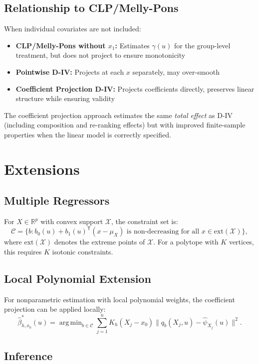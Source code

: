 \documentclass[12pt]{article}
\newcommand{\T}{\mathsf{T}}
\DeclareMathOperator*{\argmin}{arg\,min}
\newcommand{\R}{\mathbb{R}}
\begin{document}
\subsection{Relationship to CLP/Melly-Pons}

When individual covariates are not included:
\begin{itemize}
\item \textbf{CLP/Melly-Pons without $x_1$:} Estimates $\gamma(u)$ for the group-level treatment, but does not project to ensure monotonicity
\item \textbf{Pointwise D-IV:} Projects at each $x$ separately, may over-smooth
\item \textbf{Coefficient Projection D-IV:} Projects coefficients directly, preserves linear structure while ensuring validity
\end{itemize}

The coefficient projection approach estimates the same \emph{total effect} as D-IV (including composition and re-ranking effects) but with improved finite-sample properties when the linear model is correctly specified.

\section{Extensions}

\subsection{Multiple Regressors}

For $X \in \R^p$ with convex support $\mathcal{X}$, the constraint set is:
\[
\mathcal{C} = \{b : b_0(u) + b_1(u)^\T(x - \mu_X) \text{ is non-decreasing for all } x \in \text{ext}(\mathcal{X})\},
\]
where $\text{ext}(\mathcal{X})$ denotes the extreme points of $\mathcal{X}$. For a polytope with $K$ vertices, this requires $K$ isotonic constraints.

\subsection{Local Polynomial Extension}

For nonparametric estimation with local polynomial weights, the coefficient projection can be applied locally:
\[
\hat{\beta}^*_{h,x_0}(u) = \argmin_{b \in \mathcal{C}} \sum_{j=1}^n K_h(X_j - x_0) \|q_b(X_j, u) - \hat{\psi}_{X_j}(u)\|^2.
\]

\subsection{Inference}
\end{document}
